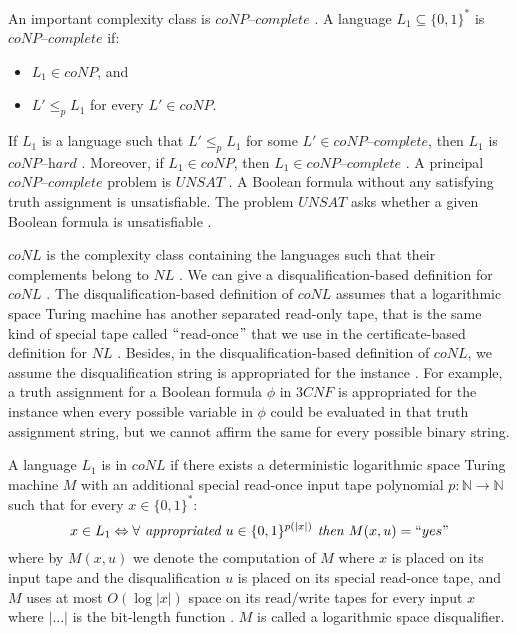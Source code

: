 \documentclass[a4paper,UKenglish,cleveref, autoref]{lipics-v2019}
\begin{document}
An important complexity class is $\textit{coNP--complete}$ \cite{GJ79}. A language $L_{1} \subseteq \{0, 1\}^{*}$ is $\textit{coNP--complete}$ if:

\begin{itemize}
\item $L_{1} \in coNP$, and
\item $L' \leq_{p} L_{1}$ for every $L' \in coNP$.
\end{itemize}

If $L_{1}$ is a language such that $L' \leq_{p} L_{1}$ for some $L' \in \textit{coNP--complete}$, then $L_{1}$ is $\textit{coNP--hard}$ \cite{CLRS01}. Moreover, if $L_{1} \in coNP$, then $L_{1} \in \textit{coNP--complete}$ \cite{CLRS01}. A principal $\textit{coNP--complete}$ problem is $UNSAT$ \cite{GJ79}. A Boolean formula without any satisfying truth assignment is unsatisfiable. The problem $UNSAT$ asks whether a given Boolean formula is unsatisfiable \cite{GJ79}.

$coNL$ is the complexity class containing the languages such that their complements belong to $NL$ \cite{Pap03}. We can give a disqualification-based definition for $coNL$ \cite{AB09}. The disqualification-based definition of $coNL$ assumes that a logarithmic space Turing machine has another separated read-only tape, that is the same kind of special tape called $``$read-once$"$ that we use in the certificate-based definition for $NL$ \cite{AB09}. Besides, in the disqualification-based definition of $coNL$, we assume the disqualification string is appropriated for the instance \cite{Pap03}. For example, a truth assignment for a Boolean formula $\phi$ in $3CNF$ is appropriated for the instance when every possible variable in $\phi$ could be evaluated in that truth assignment string, but we cannot affirm the same for every possible binary string.

\begin{definition}
A language $L_{1}$ is in $coNL$ if there exists a deterministic logarithmic space Turing machine $M$ with an additional special read-once input tape polynomial $p: \mathbb{N} \rightarrow \mathbb{N}$ such that for every $x \in \{0, 1\}^{*}$:
\[x \in L_{1} \Leftrightarrow \forall \textit{ appropriated } u \in \{0, 1\}^{p(|x|)} \textit{ then } M(x, u) = ``yes" \]
where by $M(x, u)$ we denote the computation of $M$ where $x$ is placed on its input tape and the disqualification $u$ is placed on its special read-once tape, and $M$ uses at most $O(\log |x|)$ space on its read/write tapes for every input $x$ where $|\ldots|$ is the bit-length function \cite{AB09}. $M$ is called a logarithmic space disqualifier.
\end{definition}
\end{document}
